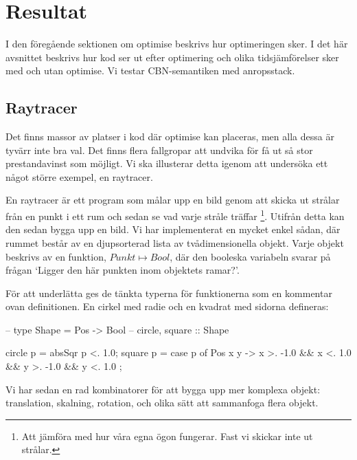 \documentclass[Rapport]{subfiles}
\begin{document}
\section{Resultat}
\label{sec:Resultat}


I den föregående sektionen om optimise beskrivs hur optimeringen sker.
I det här avsnittet beskrivs hur kod ser ut efter optimering och 
olika tidsjämförelser sker med och utan optimise. 
Vi testar CBN-semantiken med anropsstack.

\subsection{Raytracer}

Det finns massor av platser i kod där optimise kan placeras, men alla dessa är tyvärr 
inte bra val. Det finns flera fallgropar att undvika för få ut så stor 
prestandavinst som möjligt. Vi ska illusterar detta igenom att undersöka ett 
något större exempel, en raytracer.

En raytracer är ett program som målar upp en bild genom att skicka ut strålar från en punkt
i ett rum och sedan se vad varje stråle träffar
\footnote{Att jämföra med hur våra egna ögon fungerar. 
          Fast vi skickar inte ut strålar.}.
Utifrån detta kan den sedan bygga upp en bild. Vi har implementerat
en mycket enkel sådan, där rummet består av en djupsorterad lista av tvådimensionella objekt.
Varje objekt beskrivs av en funktion, $Punkt \mapsto Bool$, där den booleska
variabeln svarar på frågan `Ligger den här punkten inom objektets ramar?'.

För att underlätta ges de tänkta typerna för funktionerna som en kommentar ovan definitionen.
En cirkel med radie  och en kvadrat med sidorna  defineras:
\begin{codeEx}
-- type Shape = Pos -> Bool
-- circle, square :: Shape

circle p = absSqr p <. 1.0;
square p = case p of
    { Pos x y -> x >. -1.0 && x <. 1.0
              && y >. -1.0 && y <. 1.0
    };
\end{codeEx}

Vi har sedan en rad kombinatorer för att bygga upp mer komplexa objekt:
translation, skalning, rotation, och olika sätt att sammanfoga flera objekt.

\end{document}
